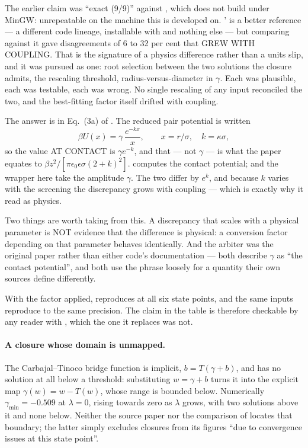 The earlier claim was ``exact (9/9)'' against , which does not
build under MinGW: unrepeatable on the machine this is developed on.
'  is a better reference --- a different
code lineage, installable with  and nothing else --- but comparing
against it gave disagreements of 6 to 32 per cent that GREW WITH COUPLING.
That is the signature of a physics difference rather than a units slip, and
it was pursued as one: root selection between the two solutions the closure
admits, the rescaling threshold, radius-versus-diameter in $\gamma$. Each
was plausible, each was testable, each was wrong. No single rescaling of any
input reconciled the two, and the best-fitting factor itself drifted with
coupling.

The answer is in Eq.~(3a) of \citet{HayterPenfold1981}. The reduced pair
potential is written
\begin{equation}
\beta U(x) = \gamma\,\frac{e^{-kx}}{x},
\qquad x = r/\sigma,\quad k = \kappa\sigma,
\label{eq:hpgamma}
\end{equation}
so the value AT CONTACT is $\gamma e^{-k}$, and that --- not $\gamma$ --- is
what the paper equates to $\beta z^2/[\pi\epsilon_0\epsilon\sigma(2+k)^2]$.
 computes the contact potential;  and the
wrapper here take the amplitude $\gamma$. The two differ by $e^{k}$, and
because $k$ varies with the screening the discrepancy grows with coupling
--- which is exactly why it read as physics.

Two things are worth taking from this. A discrepancy that scales with a
physical parameter is NOT evidence that the difference is physical: a
conversion factor depending on that parameter behaves identically. And the
arbiter was the original paper rather than either code's documentation ---
both describe $\gamma$ as ``the contact potential'', and both use the phrase
loosely for a quantity their own sources define differently.

With the factor applied,  reproduces
 at all six state points, and the same inputs reproduce
 to the same precision. The claim in the table is therefore
checkable by any reader with , which the one it
replaces was not.

\paragraph{A closure whose domain is unmapped.} The Carbajal--Tinoco bridge
function \citep{CarbajalTinoco2022} is implicit, $b = T(\gamma + b)$, and
has no solution at all below a
threshold: substituting $w = \gamma + b$ turns it into the explicit map
$\gamma(w) = w - T(w)$, whose range is bounded below. Numerically
$\gamma_{\min} = -0.509$ at $\lambda = 0$, rising towards zero as $\lambda$
grows, with two solutions above it and none below. Neither the source paper
nor the comparison of \citet{PihlajamaaJanssen2024} locates that boundary;
the latter simply excludes closures from its figures ``due to convergence
issues at this state point''.

